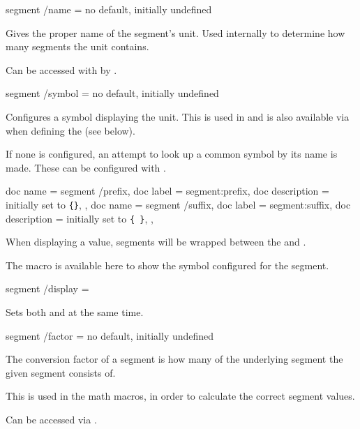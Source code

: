 \documentclass{article}
\begin{document}
\begin{docKey}
	[]
	[doc label=segment:name]
	{segment /name}
	{=}
	{no default, initially undefined}

	Gives the proper name of the segment's unit. Used internally to determine how many segments the unit contains.
	
	Can be accessed with by .
\end{docKey}

\begin{docKey}
	[]
	[doc label=segment:symbol]
	{segment /symbol}
	{=}
	{no default, initially undefined}

	Configures a symbol displaying the unit. This is used in  and is also available via  when defining the  (see below).
	
	If none is configured, an attempt to look up a common symbol by its name is made. These can be configured with .
\end{docKey}

\begin{docKeys}
	[
		doc parameter = {=\meta{...}},
	]
	{
		{
			doc name = {segment /prefix},
			doc label = segment:prefix,
			doc description = {initially set to \texttt{\{\}}},
		},
		{
			doc name = {segment /suffix},
			doc label = segment:suffix,
			doc description = {initially set to \texttt{\{~\}}},
		},
	}

	When displaying a value, segments will be wrapped between the  and .
	
	The macro  is available here to show the symbol configured for the segment.
\end{docKeys}

\begin{docKey}
	[]
	[doc label=segment:display]
	{segment /display}
	{=}
	{}

	Sets both  and  at the same time.
\end{docKey}

\begin{docKey}
	[]
	[doc label=segment:factor]
	{segment /factor}
	{=}
	{no default, initially undefined}
	
	The conversion factor of a segment is how many of the underlying segment the given segment consists of.
	
	This is used in the math macros, in order to calculate the correct segment values.
	
	Can be accessed via .
\end{docKey}
\end{document}
